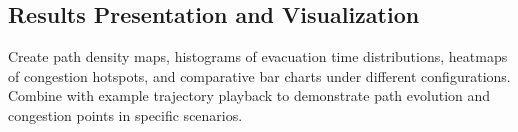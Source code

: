 \subsection{Results Presentation and Visualization}
Create path density maps, histograms of evacuation time distributions, heatmaps of congestion hotspots, and comparative bar charts under different configurations. Combine with example trajectory playback to demonstrate path evolution and congestion points in specific scenarios.